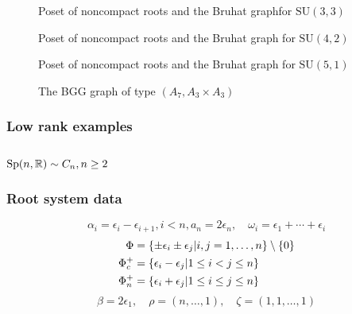 \begin{figure}[H]
  \centering 
	\resizebox{\textwidth}{!}{
   
	 
	}
  \caption{Poset of noncompact roots and the Bruhat graphfor $\mathrm{SU}(3,3)$}
\end{figure} 

\begin{figure}[H]
  \centering 
   
	 
  \caption{Poset of noncompact roots and the Bruhat graph for $\mathrm{SU}(4,2)$}
\end{figure} 

\begin{figure}[H]
  \centering 
  
	
  \caption{Poset of noncompact roots and the Bruhat graph for $\mathrm{SU}(5,1)$}
\end{figure} 


\begin{figure}[H]
  \centering 
  
  \caption{The BGG graph of type $(A_7,A_3\times A_3)$}
\end{figure} 

\subsubsection*{Low rank examples}


\clearpage

\subsection[Sp(n,R)]{$\mathrm{Sp}(n,\mathbb{R}) \sim C_n, n \geq 2$}

\subsubsection{Root system data}

\[ \alpha_i = \epsilon_i - \epsilon_{i+1}, i< n,a_n = 2\epsilon_n, \quad \omega_i=\epsilon_1+\cdots+\epsilon_i\]
\begin{align*}
 \Phi &= \{\pm \epsilon_i \pm \epsilon_j | i,j = 1,\ldots, n \}\setminus\{0\}\\
 \Phi_c^+ &= \{ \epsilon_i-\epsilon_j | 1\leq i < j \leq  n\}\\
 \Phi_n^+ &= \{ \epsilon_i + \epsilon_j | 1 \leq i \leq  j \leq n \}
\end{align*}
\[\beta = 2\epsilon_1,\quad \rho = (n,\ldots ,1),\quad \zeta = (1,1,\ldots,1)\]

